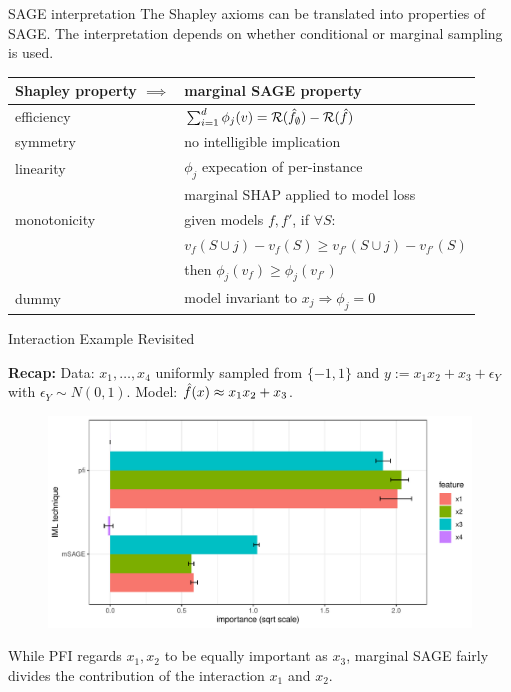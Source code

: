 \documentclass[11pt,compress,t,notes=noshow, aspectratio=169, xcolor=table]{beamer}
\begin{document}
\begin{frame}{SAGE interpretation}
%
The Shapley axioms can be translated into properties of SAGE. The interpretation depends on whether conditional or marginal sampling is used.
%
\begin{table}
  \centering
  \begin{tabular}{l | l }
  Shapley property $\implies$ & marginal SAGE property \\
  \hline
  efficiency & $\sum_{i=1}^d \phi_j(v) = \risk(\fh_\emptyset) - \risk(\fh)$\\
  symmetry & no intelligible implication \\
  linearity & $\phi_j$ expecation of per-instance\\
  & marginal SHAP applied to model loss\\
  monotonicity & given models $f, f'$, if  $\forall S:$\\
  &$v_f(S \cup j) - v_f(S) \geq v_{f'}(S \cup j) - v_{f'}(S)$ \\
  &then $\phi_j(v_f) \geq \phi_j(v_{f'})$\\
  dummy & model invariant to $x_j \Rightarrow \phi_j = 0$\\
  \end{tabular}
\end{table}
%
\end{frame}

\begin{frame}{Interaction Example Revisited}

\textbf{Recap:} Data: $x_1, \dots, x_4$ uniformly sampled from $\{-1, 1\}$ and $y:= x_1 x_2 + x_3 + \epsilon_Y$ with $\epsilon_Y \sim N(0, 1)$. Model: $\fh(x) \approx x_1 x_2 + x_3$.\\
%
\begin{figure}
  \includegraphics[width=0.7\linewidth]{figure_man/sage_pfi_interactions}
\end{figure}
%
While PFI regards $x_1, x_2$ to be equally important as $x_3$, marginal SAGE fairly divides the contribution of the interaction $x_1$ and $x_2$.
  
\end{frame}
\end{document}
